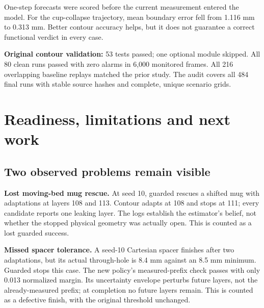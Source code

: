\documentclass[10pt,letterpaper]{article}
\newcommand{\note}[1]{\begin{tcolorbox}[colback=pale,colframe=teal!55,boxrule=0.5pt,arc=2pt,left=8pt,right=8pt,top=5pt,bottom=5pt]#1\end{tcolorbox}}
\newcommand{\nextpage}{\clearpage}
\begin{document}
One-step forecasts were scored before the current measurement entered the model.
For the cup-collapse trajectory, mean boundary error fell from 1.116 mm to
0.313 mm. Better contour accuracy helps, but it does not guarantee a correct
functional verdict in every case.

\note{\textbf{Original contour validation:} 53 tests passed; one optional module skipped.
All 80 clean runs passed with zero alarms in 6,000 monitored frames. All 216
overlapping baseline replays matched the prior study. The audit covers all 484
final runs with stable source hashes and complete, unique scenario grids.}

\nextpage
\section{Readiness, limitations and next work}

\subsection*{Two observed problems remain visible}
\textbf{Lost moving-bed mug rescue.} At seed 10, guarded rescues a shifted mug
with adaptations at layers 108 and 113. Contour adapts at 108 and stops at 111;
every candidate reports one leaking layer. The logs establish the estimator's
belief, not whether the stopped physical geometry was actually open. This is
counted as a lost guarded success.

\textbf{Missed spacer tolerance.} A seed-10 Cartesian spacer finishes after two
adaptations, but its actual through-hole is 8.4 mm against an 8.5 mm minimum.
Guarded stops this case. The new policy's measured-prefix check passes with only
0.013 normalized margin. Its uncertainty envelope perturbs future layers, not
the already-measured prefix; at completion no future layers remain. This is
counted as a defective finish, with the original threshold unchanged.
\end{document}
